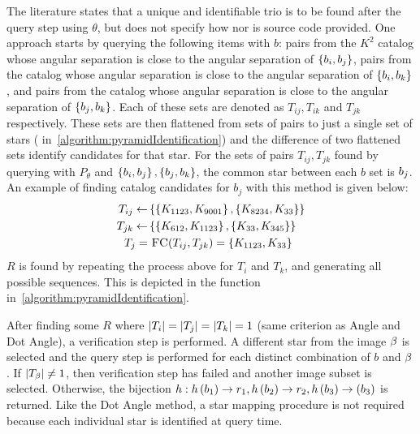 The literature states that a unique and identifiable trio is to be found after the query step using $\theta$,
but does not specify how nor is source code provided.
One approach starts by querying the following items with $b$: pairs from the $K^2$ catalog whose angular separation
is close to the angular separation of $\left\{ b_i, b_j \right\}$, pairs from the catalog whose angular separation
is close to the angular separation of $\left\{ b_i, b_k \right\}$, and pairs from the catalog whose angular separation is
close to the angular separation of $\left\{  b_j, b_k  \right\}$.
Each of these sets are denoted as $T_{ij}, T_{ik}$ and $T_{jk}$ respectively.
These sets are then flattened from sets of pairs to just a single set of stars (
in~\autoref{algorithm:pyramidIdentification}) and the difference of two flattened sets identify candidates for that
star.
For the sets of pairs $T_{ij}, T_{jk}$ found by querying with $P_\theta$ and $\left\{ b_i, b_j \right\},
\left\{ b_j, b_k \right\}$, the common star between each $b$ set is $b_j$.
An example of finding catalog candidates for $b_j$ with this method is given below:
\begin{equation}
    \begin{aligned}
        T_{ij} \gets& \set{ \set{\vv{K_{1123}}, \vv{K_{9001}}}, \set{\vv{K_{8234}}, \vv{K_{33}}} } \\
        T_{jk} \gets& \set{ \set{\vv{K_{612}}, \vv{K_{1123}}}, \set{\vv{K_{33}}, \vv{K_{345}}} } \\
        T_j =& \  \Call{FC}{T_{ij}, T_{jk}} = \set{\vv{K_{1123}}, \vv{K_{33}}}
    \end{aligned}
\end{equation}
$R$ is found by repeating the process above for $T_i$ and $T_k$, and generating all possible sequences.
This is depicted in the  function in~\autoref{algorithm:pyramidIdentification}.

After finding some $R$ where $\left| T_i \right| = \left| T_j \right| = \left| T_k \right| = 1$ (same criterion as Angle and Dot Angle), a
verification step is performed.
A different star from the image $\beta$ is selected and the query step is performed for each distinct combination
of $b$ and $\beta$.
If $\left| T_\beta \right| \neq 1$, then verification step has failed and another image subset is selected.
Otherwise, the bijection $h : h\left(b_1\right) \rightarrow r_1, h\left(b_2\right)
\rightarrow r_2, h\left(b_3\right) \rightarrow(b_3)$ is returned.
Like the Dot Angle method, a star mapping procedure is not required because each individual star is identified
at query time.

